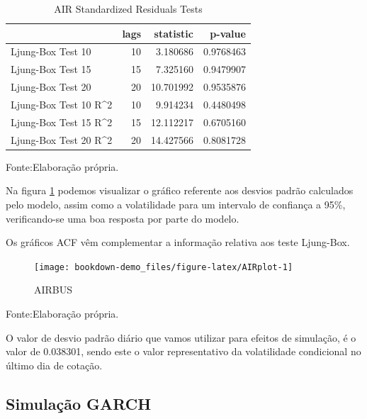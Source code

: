 \documentclass[
  12pt,
  a4paper,
  openany]{book}
\begin{document}
\begin{table}[!h]

\caption{\label{tab:AIRLjunk}AIR Standardized Residuals Tests}
\centering
\begin{tabular}[t]{lrrr}
\toprule
  & lags & statistic & p-value\\
\midrule
Ljung-Box Test 10 & 10 & 3.180686 & 0.9768463\\
Ljung-Box Test 15 & 15 & 7.325160 & 0.9479907\\
Ljung-Box Test 20 & 20 & 10.701992 & 0.9535876\\
Ljung-Box Test 10 R\textasciicircum{}2 & 10 & 9.914234 & 0.4480498\\
Ljung-Box Test 15 R\textasciicircum{}2 & 15 & 12.112217 & 0.6705160\\
\addlinespace
Ljung-Box Test 20 R\textasciicircum{}2 & 20 & 14.427566 & 0.8081728\\
\bottomrule
\end{tabular}
\end{table}
\FloatBarrier
\centering

Fonte:Elaboração própria.

\justifying
\bigskip

Na figura \ref{fig:AIRplot} podemos visualizar o gráfico referente aos desvios padrão calculados pelo modelo, assim como a volatilidade para um intervalo de confiança a 95\%, verificando-se uma boa resposta por parte do modelo.

Os gráficos ACF vêm complementar a informação relativa aos teste Ljung-Box.

\begin{figure}

{\centering \texttt{[image: bookdown-demo\_files/figure-latex/AIRplot-1]} 

}

\caption{AIRBUS}\label{fig:AIRplot}
\end{figure}
\FloatBarrier
\centering

Fonte:Elaboração própria.

\justifying
\bigskip

O valor de desvio padrão diário que vamos utilizar para efeitos de simulação, é o valor de 0.038301, sendo este o valor representativo da volatilidade condicional no último dia de cotação.

\hypertarget{simulauxe7uxe3o-garch}{%
\subsection{Simulação GARCH}\label{simulauxe7uxe3o-garch}}
\end{document}
